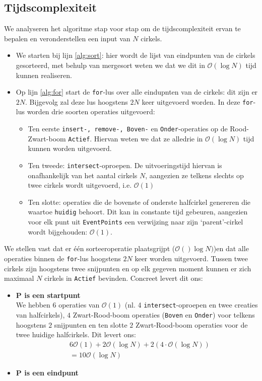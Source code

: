 \documentclass[12pt]{article}
\begin{document}
\subsection{Tijdscomplexiteit}
We analyseren het algoritme stap voor stap om de tijdscomplexiteit ervan te bepalen en veronderstellen een input van $N$ cirkels.
\begin{itemize}
	\item  We starten bij lijn \ref{alg:sort}: hier wordt de lijst van eindpunten van de cirkels gesorteerd, met behulp van mergesort weten we dat we dit in $\mathcal{O}(\log N)$ tijd kunnen realiseren.
	\item Op lijn \ref{alg:for} start de \texttt{for}-lus over alle eindupnten van de cirkels: dit zijn er $2N$. Bijgevolg zal deze lus hoogstens $2N$ keer uitgevoerd worden. In deze \texttt{for}-lus worden drie soorten operaties uitgevoerd:
	\begin{itemize}
		\item Ten eerste \texttt{insert-, remove-, Boven-} en \texttt{Onder}-operaties op de Rood-Zwart-boom \texttt{Actief}. Hiervan weten we dat ze alledrie in $\mathcal{O}(\log N)$ tijd kunnen worden uitgevoerd.
		\item  Ten tweede: \texttt{intersect}-oproepen. De uitvoeringstijd hiervan is onafhankelijk van het aantal cirkels $N$, aangezien ze telkens slechts op twee cirkels wordt uitgevoerd, i.e. $\mathcal{O}(1)$
		\item Ten slotte: operaties die de bovenste of onderste halfcirkel genereren die waartoe \texttt{huidig} behoort. Dit kan in constante tijd gebeuren, aangezien voor elk punt uit \texttt{EventPoints} een verwijzing naar zijn `parent'-cirkel wordt bijgehouden: $\mathcal{O}(1)$.
	\end{itemize}
\end{itemize}
We stellen vast dat er één sorteeroperatie plaatsgrijpt ($\mathcal{O}()\log N)$)en dat alle operaties binnen de \texttt{for}-lus hoogstens $2N$ keer worden uitgevoerd. Tussen twee cirkels zijn hoogstens twee snijpunten en op elk gegeven moment kunnen er zich maximaal $N$ cirkels in \texttt{Actief} bevinden. Concreet levert dit ons:
\begin{itemize}
	\item  \textbf{P is een startpunt}\\
	We hebben $6$ operaties van $\mathcal{O}(1)$ (nl. 4 \texttt{intersect}-oproepen en twee creaties van halfcirkels), $4$ Zwart-Rood-boom operaties (\texttt{Boven} en \texttt{Onder}) voor telkens hoogstens $2$ snijpunten en ten slotte $2$ Zwart-Rood-boom operaties voor de twee huidige halfcirkels. Dit levert ons:
	\begin{align*}
	&6 \mathcal{O}(1) + 2 \mathcal{O}(\log N)  + 2 \left(4 \cdot \mathcal{O}(\log N)\right)\\
	&= 10\mathcal{O}(\log N)
	\end{align*} 
	\item \textbf{P is een eindpunt}\\
\end{itemize}
\end{document}
